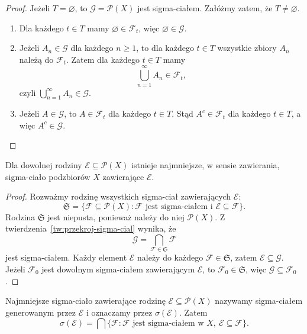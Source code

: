 \begin{proof}
Jeżeli $T=\varnothing$, to $\mathcal{G}=\mathcal{P}(X)$ jest sigma-ciałem.
Załóżmy zatem, że $T\neq\varnothing$.
\begin{enumerate}
  \item Dla każdego $t\in T$ mamy $\varnothing\in\mathcal{F}_t$,
  więc $\varnothing\in\mathcal{G}$.
  \item Jeżeli $A_n\in\mathcal{G}$ dla każdego $n\geq1$, to dla każdego
  $t\in T$ wszystkie zbiory $A_n$ należą do $\mathcal{F}_t$.
  Zatem dla każdego $t\in T$ mamy
  \[
    \bigcup_{n=1}^{\infty}A_n\in\mathcal{F}_t,
  \]
  czyli $\bigcup_{n=1}^{\infty}A_n\in\mathcal{G}$.
  \item Jeżeli $A\in\mathcal{G}$, to $A\in\mathcal{F}_t$ dla każdego
  $t\in T$. Stąd $A^c\in\mathcal{F}_t$ dla każdego $t\in T$,
  a więc $A^c\in\mathcal{G}$.
\end{enumerate}
\end{proof}

\begin{wniosek}
Dla dowolnej rodziny $\mathcal{E}\subseteq\mathcal{P}(X)$ istnieje
najmniejsze, w sensie zawierania, sigma-ciało podzbiorów $X$
zawierające $\mathcal{E}$.
\label{wn:najmniejsze-sigma-cialo}
\end{wniosek}

\begin{proof}
Rozważmy rodzinę wszystkich sigma-ciał zawierających $\mathcal{E}$:
\[
  \mathfrak{S}=\{\mathcal{F}\subseteq\mathcal{P}(X):
    \mathcal{F}\text{ jest sigma-ciałem i }\mathcal{E}\subseteq\mathcal{F}\}.
\]
Rodzina $\mathfrak{S}$ jest niepusta, ponieważ należy do niej
$\mathcal{P}(X)$. Z twierdzenia~\ref{tw:przekroj-sigma-cial} wynika, że
\[
  \mathcal{G}=\bigcap_{\mathcal{F}\in\mathfrak{S}}\mathcal{F}
\]
jest sigma-ciałem. Każdy element $\mathcal{E}$ należy do każdego
$\mathcal{F}\in\mathfrak{S}$, zatem $\mathcal{E}\subseteq\mathcal{G}$.
Jeżeli $\mathcal{F}_0$ jest dowolnym sigma-ciałem zawierającym
$\mathcal{E}$, to $\mathcal{F}_0\in\mathfrak{S}$, więc
$\mathcal{G}\subseteq\mathcal{F}_0$.
\end{proof}

\begin{definicja}
Najmniejsze sigma-ciało zawierające rodzinę
$\mathcal{E}\subseteq\mathcal{P}(X)$ nazywamy sigma-ciałem
generowanym przez $\mathcal{E}$ i oznaczamy przez $\sigma(\mathcal{E})$.
Zatem
\begin{equation}
  \sigma(\mathcal{E})
  =\bigcap\{\mathcal{F}:\mathcal{F}\text{ jest sigma-ciałem w }X,
     \ \mathcal{E}\subseteq\mathcal{F}\}.
  \label{eq:sigma-generowane}
\end{equation}
\end{definicja}


